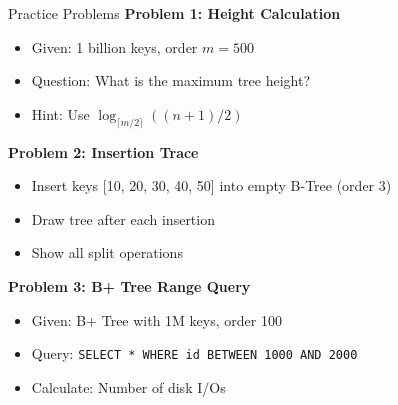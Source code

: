 \documentclass[aspectratio=169]{beamer}
\begin{document}
\begin{frame}{Practice Problems}
  \textbf{Problem 1: Height Calculation}
  \begin{itemize}
    \item Given: 1 billion keys, order $m=500$
    \item Question: What is the maximum tree height?
    \item Hint: Use $\log_{\lceil m/2 \rceil}((n+1)/2)$
  \end{itemize}

  \vspace{0.3cm}
  \textbf{Problem 2: Insertion Trace}
  \begin{itemize}
    \item Insert keys [10, 20, 30, 40, 50] into empty B-Tree (order 3)
    \item Draw tree after each insertion
    \item Show all split operations
  \end{itemize}

  \vspace{0.3cm}
  \textbf{Problem 3: B+ Tree Range Query}
  \begin{itemize}
    \item Given: B+ Tree with 1M keys, order 100
    \item Query: \texttt{SELECT * WHERE id BETWEEN 1000 AND 2000}
    \item Calculate: Number of disk I/Os
  \end{itemize}
\end{frame}
\end{document}
